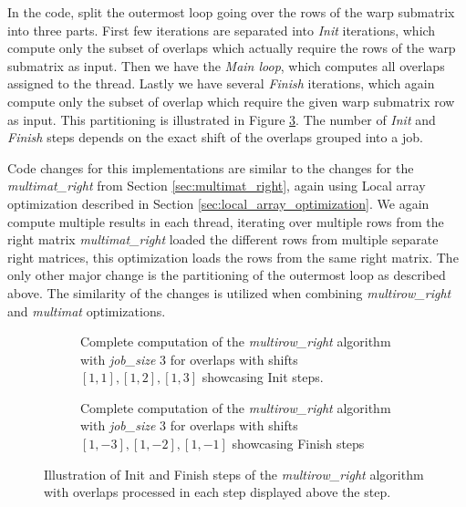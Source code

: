 In the code, split the outermost loop going over the rows of the warp submatrix into three parts. First few iterations are separated into \textit{Init} iterations, which compute only the subset of overlaps which actually require the rows of the warp submatrix as input. Then we have the \textit{Main loop}, which computes all overlaps assigned to the thread. Lastly we have several \textit{Finish} iterations, which again compute only the subset of overlap which require the given warp submatrix row as input. This partitioning is illustrated in Figure \ref{fig:multirow_right_steps}. The number of \textit{Init} and \textit{Finish} steps depends on the exact shift of the overlaps grouped into a job.

Code changes for this implementations are similar to the changes for the \textit{multimat\_right} from Section \ref{sec:multimat_right}, again using Local array optimization described in Section \ref{sec:local_array_optimization}. We again compute multiple results in each thread, iterating over multiple rows from the right matrix \textit{multimat\_right} loaded the different rows from multiple separate right matrices, this optimization loads the rows from the same right matrix. The only other major change is the partitioning of the outermost loop as described above. The similarity of the changes is utilized when combining  \textit{multirow\_right} and \textit{multimat} optimizations.



\begin{figure}[ht]
	\centering	
	\begin{subfigure}{\textwidth}
		\centering
		\def\svgwidth{\textwidth}
		
		\caption{Complete computation of the \textit{multirow\_right} algorithm with \textit{job\_size} 3 for overlaps with shifts $[1, 1], [1, 2], [1, 3]$ showcasing Init steps.}
		\label{fig:multirow_init}
	\end{subfigure}
	\hfill
	\begin{subfigure}{\textwidth}
		\centering
		\def\svgwidth{\textwidth}
		
		\caption{Complete computation of the \textit{multirow\_right} algorithm with \textit{job\_size} 3 for overlaps with shifts $[1, -3], [1, -2], [1, -1]$ showcasing Finish steps}
		\label{fig:multirow_fini}
	\end{subfigure}
	
	\caption{Illustration of Init and Finish steps of the \textit{multirow\_right} algorithm with overlaps processed in each step displayed above the step.}
	\label{fig:multirow_right_steps}
\end{figure}



